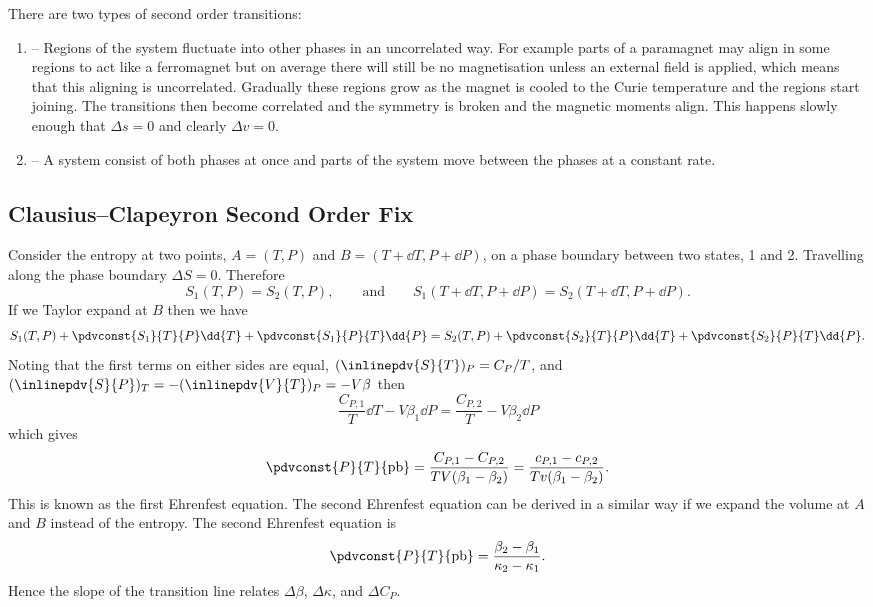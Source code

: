    There are two types of second order transitions:
    \begin{enumerate}
        \item {} -- Regions of the system fluctuate into other phases in an uncorrelated way.
        For example parts of a paramagnet may align in some regions to act like a ferromagnet but on average there will still be no magnetisation unless an external field is applied, which means that this aligning is uncorrelated.
        Gradually these regions grow as the magnet is cooled to the Curie temperature and the regions start joining.
        The transitions then become correlated and the symmetry is broken and the magnetic moments align.
        This happens slowly enough that \(\Delta s = 0\) and clearly \(\Delta v = 0\).
        
        \item {} -- A system consist of both phases at once and parts of the system move between the phases at a constant rate.
    \end{enumerate}
    
    \subsection{Clausius--Clapeyron Second Order Fix}
    Consider the entropy at two points, \(A = (T, P)\) and \(B = (T + \dd{T}, P + \dd{P})\), on a phase boundary between two states, 1 and 2.
    Travelling along the phase boundary \(\Delta S = 0\).
    Therefore
    \[S_1(T, P) = S_2(T, P), \qquad\text{and}\qquad S_1(T + \dd{T}, P + \dd{P}) = S_2(T + \dd{T}, P + \dd{P}).\]
    If we Taylor expand at \(B\) then we have
    \[S_1(T, P) + \pdvconst{S_1}{T}{P}\dd{T} + \pdvconst{S_1}{P}{T}\dd{P} = S_2(T, P) + \pdvconst{S_2}{T}{P}\dd{T} + \pdvconst{S_2}{P}{T}\dd{P}.\]
    Noting that the first terms on either sides are equal, \((\inlinepdv{S}{T})_P = C_P/T\), and \((\inlinepdv{S}{P})_T = -(\inlinepdv{V}{T})_P = -V\beta\) then
    \[\frac{C_{P,1}}{T}\dd{T} - V\beta_1\dd{P} = \frac{C_{P,2}}{T} - V\beta_2\dd{P}\]
    which gives
    \[\pdvconst{P}{T}{\mathrm{pb}} = \frac{C_{P,1} - C_{P,2}}{TV(\beta_1 - \beta_2)} = \frac{c_{P,1} - c_{P,2}}{Tv(\beta_1 - \beta_2)}.\]
    This is known as the first Ehrenfest equation.
    The second Ehrenfest equation can be derived in a similar way if we expand the volume at \(A\) and \(B\) instead of the entropy.
    The second Ehrenfest equation is
    \[\pdvconst{P}{T}{\mathrm{pb}} = \frac{\beta_2 - \beta_1}{\kappa_2 - \kappa_1}.\]
    Hence the slope of the transition line relates \(\Delta\beta\), \(\Delta\kappa\), and \(\Delta C_P\).
    
